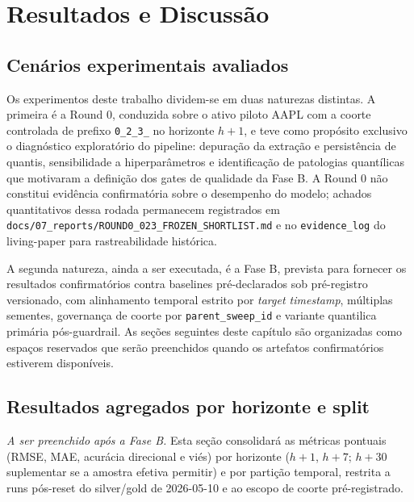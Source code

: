 \chapter{Resultados e Discussão}


\section{Cenários experimentais avaliados}
Os experimentos deste trabalho dividem-se em duas naturezas distintas. A primeira é a Round 0, conduzida sobre o ativo piloto AAPL com a coorte controlada de prefixo \texttt{0\_2\_3\_} no horizonte \(h+1\), e teve como propósito exclusivo o diagnóstico exploratório do pipeline: depuração da extração e persistência de quantis, sensibilidade a hiperparâmetros e identificação de patologias quantílicas que motivaram a definição dos gates de qualidade da Fase B. A Round 0 não constitui evidência confirmatória sobre o desempenho do modelo; achados quantitativos dessa rodada permanecem registrados em \texttt{docs/07\_reports/ROUND0\_023\_FROZEN\_SHORTLIST.md} e no \texttt{evidence\_log} do living-paper para rastreabilidade histórica.

A segunda natureza, ainda a ser executada, é a Fase B, prevista para fornecer os resultados confirmatórios contra baselines pré-declarados sob pré-registro versionado, com alinhamento temporal estrito por \textit{target timestamp}, múltiplas sementes, governança de coorte por \texttt{parent\_sweep\_id} e variante quantilica primária pós-guardrail. As seções seguintes deste capítulo são organizadas como espaços reservados que serão preenchidos quando os artefatos confirmatórios estiverem disponíveis.

\section{Resultados agregados por horizonte e split}
\textit{A ser preenchido após a Fase B.} Esta seção consolidará as métricas pontuais (RMSE, MAE, acurácia direcional e viés) por horizonte (\(h+1\), \(h+7\); \(h+30\) suplementar se a amostra efetiva permitir) e por partição temporal, restrita a runs pós-reset do silver/gold de 2026-05-10 e ao escopo de coorte pré-registrado.

